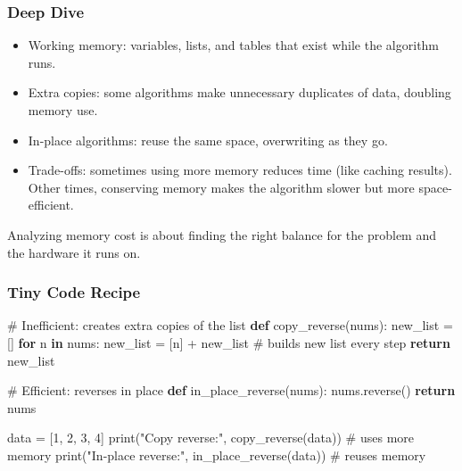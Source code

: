 \documentclass[
  letterpaper,
  DIV=11,
  numbers=noendperiod]{scrreprt}
\newenvironment{Shaded}{\begin{snugshade}}{\end{snugshade}}
\newcommand{\BuiltInTok}[1]{\textcolor[rgb]{0.00,0.23,0.31}{#1}}
\newcommand{\CommentTok}[1]{\textcolor[rgb]{0.37,0.37,0.37}{#1}}
\newcommand{\ControlFlowTok}[1]{\textcolor[rgb]{0.00,0.23,0.31}{\textbf{#1}}}
\newcommand{\DecValTok}[1]{\textcolor[rgb]{0.68,0.00,0.00}{#1}}
\newcommand{\KeywordTok}[1]{\textcolor[rgb]{0.00,0.23,0.31}{\textbf{#1}}}
\newcommand{\NormalTok}[1]{\textcolor[rgb]{0.00,0.23,0.31}{#1}}
\newcommand{\OperatorTok}[1]{\textcolor[rgb]{0.37,0.37,0.37}{#1}}
\newcommand{\StringTok}[1]{\textcolor[rgb]{0.13,0.47,0.30}{#1}}
\providecommand{\tightlist}{%
  \setlength{\itemsep}{0pt}\setlength{\parskip}{0pt}}
\begin{document}
\subsubsection{Deep Dive}\label{deep-dive-43}

\begin{itemize}
\tightlist
\item
  Working memory: variables, lists, and tables that exist while the
  algorithm runs.
\item
  Extra copies: some algorithms make unnecessary duplicates of data,
  doubling memory use.
\item
  In-place algorithms: reuse the same space, overwriting as they go.
\item
  Trade-offs: sometimes using more memory reduces time (like caching
  results). Other times, conserving memory makes the algorithm slower
  but more space-efficient.
\end{itemize}

Analyzing memory cost is about finding the right balance for the problem
and the hardware it runs on.

\subsubsection{Tiny Code Recipe}\label{tiny-code-recipe-71}

\begin{Shaded}
\begin{Highlighting}[]
\CommentTok{\# Inefficient: creates extra copies of the list}
\KeywordTok{def}\NormalTok{ copy\_reverse(nums):}
\NormalTok{    new\_list }\OperatorTok{=}\NormalTok{ []}
    \ControlFlowTok{for}\NormalTok{ n }\KeywordTok{in}\NormalTok{ nums:}
\NormalTok{        new\_list }\OperatorTok{=}\NormalTok{ [n] }\OperatorTok{+}\NormalTok{ new\_list  }\CommentTok{\# builds new list every step}
    \ControlFlowTok{return}\NormalTok{ new\_list}

\CommentTok{\# Efficient: reverses in place}
\KeywordTok{def}\NormalTok{ in\_place\_reverse(nums):}
\NormalTok{    nums.reverse()}
    \ControlFlowTok{return}\NormalTok{ nums}

\NormalTok{data }\OperatorTok{=}\NormalTok{ [}\DecValTok{1}\NormalTok{, }\DecValTok{2}\NormalTok{, }\DecValTok{3}\NormalTok{, }\DecValTok{4}\NormalTok{]}
\BuiltInTok{print}\NormalTok{(}\StringTok{"Copy reverse:"}\NormalTok{, copy\_reverse(data))      }\CommentTok{\# uses more memory}
\BuiltInTok{print}\NormalTok{(}\StringTok{"In{-}place reverse:"}\NormalTok{, in\_place\_reverse(data))  }\CommentTok{\# reuses memory}
\end{Highlighting}
\end{Shaded}
\end{document}
